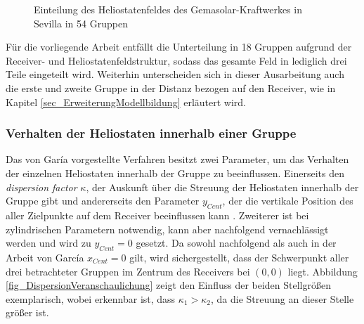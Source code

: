 \begin{figure}[h!]
    \centering
    \setlength{\fboxsep}{1pt}
    \setlength{\fboxrule}{1pt}
    \caption[Einteilung des Heliostatenfeldes des Gemasolar-Kraftwerkes in Sevilla in 54 Gruppen]{Einteilung des Heliostatenfeldes des Gemasolar-Kraftwerkes in Sevilla in 54 Gruppen \cite[S.10]{Garcia2}}
    \label{fig_VerteilungHeliostateGarcia}
\end{figure}

Für die vorliegende Arbeit entfällt die Unterteilung in 18 Gruppen aufgrund der Receiver- und Heliostatenfeldstruktur, sodass das gesamte Feld in lediglich drei Teile eingeteilt wird.
Weiterhin unterscheiden sich in dieser Ausarbeitung auch die erste und zweite Gruppe in der Distanz bezogen auf den Receiver, wie in Kapitel \ref{sec_ErweiterungModellbildung} erläutert wird.

\subsubsection*{Verhalten der Heliostaten innerhalb einer Gruppe} \label{subsubsec_Gruppenverhalten}
Das von Garía vorgestellte Verfahren besitzt zwei Parameter, um das Verhalten der einzelnen Heliostaten innerhalb der Gruppe zu beeinflussen.
Einerseits den \textit{dispersion factor} $\kappa$, der Auskunft über die Streuung der Heliostaten innerhalb der Gruppe gibt und andererseits den Parameter $y_{Cent}$, der die vertikale Position des  aller Zielpunkte auf dem Receiver beeinflussen kann \cite[S.5]{Garcia2}.
Zweiterer ist bei zylindrischen Parametern notwendig, kann aber nachfolgend vernachlässigt werden und wird zu $y_{Cent} = 0$ gesetzt.
Da sowohl nachfolgend als auch in der Arbeit von García $x_{Cent} = 0$ gilt, wird sichergestellt, dass der Schwerpunkt aller drei betrachteter Gruppen im Zentrum des Receivers bei $(0,0)$ liegt.
Abbildung \ref{fig_DispersionVeranschaulichung} zeigt den Einfluss der beiden Stellgrößen exemplarisch, wobei erkennbar ist, dass $\kappa_1 > \kappa_2$, da die Streuung an dieser Stelle größer ist.

